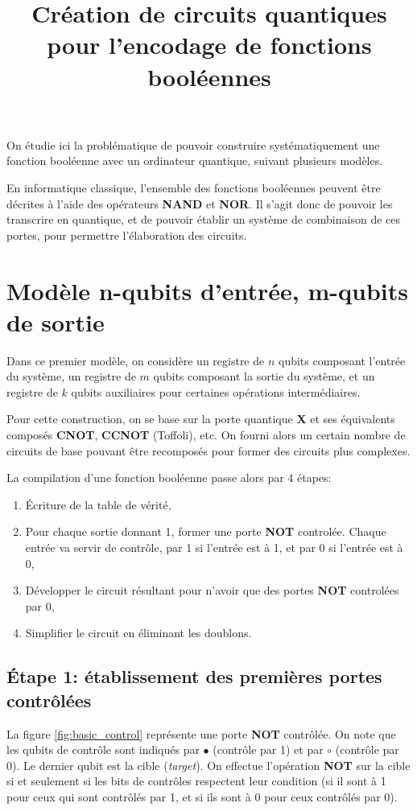 \documentclass[12pt,a4paper]{article}
\title{Création de circuits quantiques pour l'encodage de fonctions booléennes}
\date{}
\begin{document}
\maketitle

On étudie ici la problématique de pouvoir construire systématiquement une fonction booléenne avec un ordinateur quantique, suivant plusieurs modèles.

En informatique classique, l'ensemble des fonctions booléennes peuvent être décrites à l'aide des opérateurs \textbf{NAND} et \textbf{NOR}. Il s'agit donc de pouvoir les transcrire en quantique, et de pouvoir établir un système de combinaison de ces portes, pour permettre l'élaboration des circuits. 

\section*{Modèle n-qubits d'entrée, m-qubits de sortie}

Dans ce premier modèle, on considère un registre de $n$ qubits composant l'entrée du système, un registre de $m$ qubits composant la sortie du système, et un registre de $k$ qubits auxiliaires pour certaines opérations intermédiaires.

Pour cette construction, on se base sur la porte quantique \textbf{X} et ses équivalents composés \textbf{CNOT}, \textbf{CCNOT} (Toffoli), etc. On fourni alors un certain nombre de circuits de base pouvant être recomposés pour former des circuits plus complexes.

La compilation d'une fonction booléenne passe alors par 4 étapes:

\begin{enumerate}
    \item \'Ecriture de la table de vérité,
    \item Pour chaque sortie donnant 1, former une porte \textbf{NOT} controlée. Chaque entrée va servir de contrôle, par 1 si l'entrée est à 1, et par 0 si l'entrée est à 0,
    \item Développer le circuit résultant pour n'avoir que des portes \textbf{NOT} controlées par 0,
    \item Simplifier le circuit en éliminant les doublons.
\end{enumerate}

\subsection*{\'Etape 1: établissement des premières portes contrôlées}
La figure \ref{fig:basic_control} représente une porte \textbf{NOT} contrôlée. On note que les qubits de contrôle sont indiqués par $\bullet$ (contrôle par 1) et par $\circ$ (contrôle par 0). Le dernier qubit est la cible (\textit{target}). On effectue l'opération \textbf{NOT} sur la cible si et seulement si les bits de contrôles respectent leur condition (si il sont à 1 pour ceux qui sont contrôlés par 1, et si ils sont à 0 pour ceux contrôlés par 0).
\end{document}
